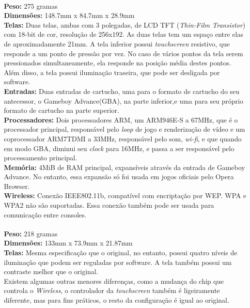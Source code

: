 \documentclass[brazil]{abnt}
\begin{document}
\\
{\bf Peso:} 275 gramas\\
{\bf Dimensões:} 148.7mm x 84.7mm x 28.9mm\\
{\bf Telas:} Duas telas, ambas com 3 polegadas, de LCD TFT (\textit{Thin-Film Transistor}) com 18-bit de cor, resolução de 256x192. As duas telas tem um espaço entre elas de aproximadamente 21mm. A tela inferior possui \textit{touchscreen} resistivo, que responde a um ponto de pressão por vez. No caso de vários pontos da tela serem pressionados simultaneamente, ela responde na posição média destes pontos.\\
Além disso, a tela possui iluminação traseira, que pode ser desligada por software.\\
{\bf Entradas:} Duas entradas de cartucho, uma para o formato de cartucho do seu antecessor, o Gameboy Advance(GBA), na parte inferior,e uma para seu próprio formato de cartucho na parte superior.\\
{\bf Processadores:} Dois processadores ARM, um ARM946E-S a 67MHz, que é o processador principal, responsável pelo \textit{loop} de jogo e renderização de vídeo e um coprocessador ARM7TDMI a 33MHz, responsável pelo som, \textit{wi-fi}, e que quando em modo GBA, diminui seu \textit{clock} para 16MHz, e passa a ser responsável pelo processamento principal.\\
{\bf Memória:} 4MiB de RAM principal, expansíveis através da entrada de Gameboy Advance. No entanto, essa expansão só foi usada em jogos oficiais pelo Opera Browser.\\
{\bf Wireless:} Conexão IEEE802.11b, compatível com encriptação por WEP. WPA e WPA2 não são suportadas. Essa conexão também pode ser usada para comunicação entre consoles.\\

\\
{\bf Peso:} 218 gramas\\
{\bf Dimensões:} 133mm x 73.9mm x 21.87mm\\
{\bf Telas:} Mesma especificação que o original, no entanto, possui quatro níveis de iluminação que podem ser reguladas por software. A tela também possui um contraste melhor que o original.\\
Existem algumas outras menores diferenças, como a mudança do chip que controla o \textit{Wireless}, o controlador da \textit{touchscreen} também é ligeiramente diferente, mas para fins práticos, o resto da configuração é igual ao original.
\end{document}
